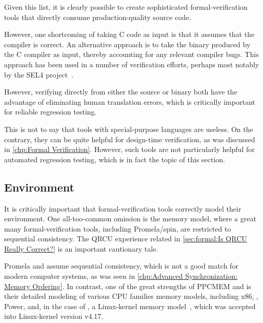 Given this list, it is clearly possible to create sophisticated
formal-verification tools that directly consume production-quality
source code.

However, one shortcoming of taking C code as input is that it assumes
that the compiler is correct.
An alternative approach is to take the binary produced by the C compiler
as input, thereby accounting for any relevant compiler bugs.
This approach has been used in a number of verification efforts,
perhaps most notably by the SEL4
project~\cite{ThomasSewell2013L4binaryVerification}.

\QuickQuizEnd

However, verifying directly from either the source or binary both have the
advantage of eliminating human translation errors, which is critically
important for reliable regression testing.

This is not to say that tools with special-purpose languages are useless.
On the contrary, they can be quite helpful for design-time verification,
as was discussed in
\cref{chp:Formal Verification}.
However, such tools are not particularly helpful for automated regression
testing, which is in fact the topic of this section.

\subsection{Environment}
\label{sec:future:Environment}

It is critically important that formal-verification tools correctly
model their environment.
One all-too-common omission is the memory model, where a great
many formal-verification tools, including Promela/spin, are
restricted to sequential consistency.
The QRCU experience related in
\cref{sec:formal:Is QRCU Really Correct?}
is an important cautionary tale.

Promela and  assume sequential consistency, which is not a
good match for modern computer systems, as was seen in
\cref{chp:Advanced Synchronization: Memory Ordering}.
In contrast, one of the great strengths of PPCMEM and 
is their detailed modeling of various CPU families memory models,
including x86, \ARM, Power, and, in the case of ,
a Linux-kernel memory model~\cite{Alglave:2018:FSC:3173162.3177156},
which was accepted into Linux-kernel version v4.17.

